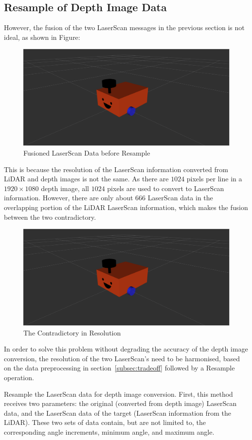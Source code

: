 \subsection{Resample of Depth Image Data}
However, the fusion of the two LaserScan messages in the previous section is not ideal, as shown in Figure:
\begin{figure}[H]
    \centering
    \includegraphics[width=0.8\linewidth]{figs/robot.png}
    \caption{Fusioned LaserScan Data before Resample}
\end{figure}
This is because the resolution of the LaserScan information converted from LiDAR and depth images is not the same. 
As there are $1024$ pixels per line in a $1920\times1080$ depth image, 
all $1024$ pixels are used to convert to LaserScan information. 
However, there are only about 666 LaserScan data in the overlapping portion of the LiDAR LaserScan information, 
which makes the fusion between the two contradictory.
\begin{figure}[H]
    \centering
    \includegraphics[width=0.8\linewidth]{figs/robot.png}
    \caption{The Contradictory in Resolution}
\end{figure}
In order to solve this problem without degrading the accuracy of the depth image conversion, 
the resolution of the two LaserScan's need to be harmonised,
based on the data preprocessing in section~\ref{subsec:tradeoff} followed by a Resample operation.

Resample the LaserScan data for depth image conversion. 
First, this method receives two parameters: the original (converted from depth image) LaserScan data, 
and the LaserScan data of the target (LaserScan information from the LiDAR). 
These two sets of data contain, but are not limited to, 
the corresponding angle increments, minimum angle, and maximum angle.

